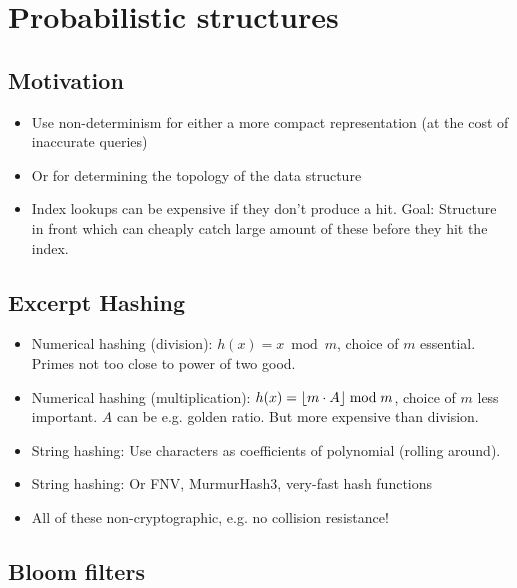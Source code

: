 \documentclass[a4paper]{scrreprt}
\DeclarePairedDelimiter\floor{\lfloor}{\rfloor}
\begin{document}
\chapter{Probabilistic structures}

\section{Motivation}

\begin{itemize}
		\item Use non-determinism for either a more compact representation (at
				the cost of inaccurate queries)
		\item Or for determining the topology of the data structure
		\item Index lookups can be expensive if they don't produce a hit. Goal:
				Structure in front which can cheaply catch large amount of
				these before they hit the index.
\end{itemize}

\section{Excerpt Hashing}

\begin{itemize}
		\item Numerical hashing (division): $h(x) = x \bmod m$, choice of $m$
				essential.  Primes not too close to power of two good.
		\item Numerical hashing (multiplication): $h(x) = \floor{m \cdot A}
				\bmod m$, choice of $m$ less important. $A$ can be e.g. golden
				ratio. But more expensive than division.
		\item String hashing: Use characters as coefficients of polynomial
				(rolling around).
		\item String hashing: Or FNV, MurmurHash3, very-fast hash functions
		\item All of these non-cryptographic, e.g. no collision resistance!
\end{itemize}

\section{Bloom filters}
\end{document}
